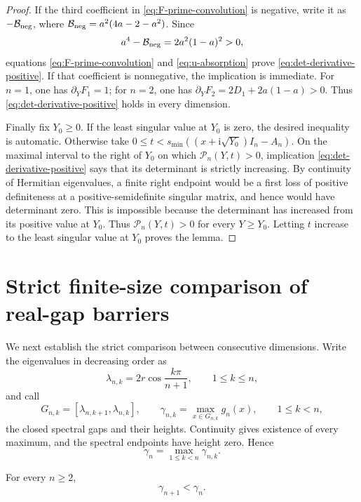 \documentclass[review,hidelinks,onefignum,onetabnum]{siamart251216}
\newcommand{\ii}{\mathrm i}
\begin{document}
\begin{proof}
If the third coefficient in \eqref{eq:F-prime-convolution} is negative,
write it as \(-\mathcal B_{\rm neg}\), where
\(\mathcal B_{\rm neg}=a^2(4a-2-a^2)\).  Since
\[
 a^4-\mathcal B_{\rm neg}=2a^2(1-a)^2>0,
\]
equations \eqref{eq:F-prime-convolution} and \eqref{eq:u-absorption}
prove \eqref{eq:det-derivative-positive}.  If that coefficient is
nonnegative, the implication is immediate.  For \(n=1\), one has
\(\partial_YF_1=1\); for \(n=2\), one has
\(\partial_YF_2=2D_1+2a(1-a)>0\).  Thus
\eqref{eq:det-derivative-positive} holds in every dimension.

Finally fix \(Y_0\geq0\).  If the least singular value at
\(Y_0\) is zero, the desired inequality is automatic.  Otherwise take
\(0\leq t<s_{\min}((x+\ii\sqrt{Y_0})I_n-A_n)\).  On the maximal interval to the
right of \(Y_0\) on which \(\mathcal P_n(Y,t)>0\), implication
\eqref{eq:det-derivative-positive} says that its determinant is strictly
increasing.  By continuity of Hermitian eigenvalues, a finite right
endpoint would be a first loss of positive definiteness at a
positive-semidefinite singular matrix, and hence would have determinant
zero.  This is impossible because the determinant has increased from
its positive value at \(Y_0\).
Thus \(\mathcal P_n(Y,t)>0\) for every \(Y\geq Y_0\).  Letting \(t\) increase to
the least singular value at \(Y_0\) proves the lemma.
\end{proof}

\section{Strict finite-size comparison of real-gap barriers}
\label{sec:mesh}

We next establish the strict comparison between consecutive dimensions.
Write the eigenvalues in decreasing order as
\[
 \lambda_{n,k}=2r\cos\frac{k\pi}{n+1},\qquad 1\leq k\leq n,
\]
and call
\[
 G_{n,k}=[\lambda_{n,k+1},\lambda_{n,k}],\qquad
 \gamma_{n,k}=\max_{x\in G_{n,k}}g_n(x),\qquad 1\leq k<n,
\]
the closed spectral gaps and their heights.  Continuity gives existence
of every maximum, and the spectral endpoints have height zero.  Hence
\begin{equation}\label{eq:gamma-def}
 \gamma_n=\max_{1\leq k<n}\gamma_{n,k}.
\end{equation}

\begin{lemma}\label{lem:mesh}
For every \(n\geq2\),
\[
 \gamma_{n+1}<\gamma_n.
\]
\end{lemma}
\end{document}
